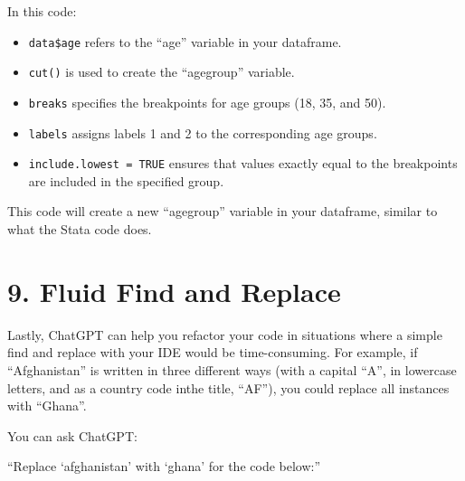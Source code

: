 \documentclass[
  letterpaper,
  DIV=11,
  numbers=noendperiod]{scrreprt}
\newenvironment{Shaded}{\begin{snugshade}}{\end{snugshade}}
\newcommand{\AttributeTok}[1]{\textcolor[rgb]{0.40,0.45,0.13}{#1}}
\newcommand{\ConstantTok}[1]{\textcolor[rgb]{0.56,0.35,0.01}{#1}}
\newcommand{\DecValTok}[1]{\textcolor[rgb]{0.68,0.00,0.00}{#1}}
\newcommand{\DocumentationTok}[1]{\textcolor[rgb]{0.37,0.37,0.37}{\textit{#1}}}
\newcommand{\FunctionTok}[1]{\textcolor[rgb]{0.28,0.35,0.67}{#1}}
\newcommand{\NormalTok}[1]{\textcolor[rgb]{0.00,0.23,0.31}{#1}}
\newcommand{\OtherTok}[1]{\textcolor[rgb]{0.00,0.23,0.31}{#1}}
\newcommand{\SpecialCharTok}[1]{\textcolor[rgb]{0.37,0.37,0.37}{#1}}
\providecommand{\tightlist}{%
  \setlength{\itemsep}{0pt}\setlength{\parskip}{0pt}}\usepackage{longtable,booktabs,array}
\begin{document}
\begin{Shaded}
\end{Shaded}

In this code:

\begin{itemize}
\tightlist
\item
  \texttt{data\$age} refers to the ``age'' variable in your dataframe.
\item
  \texttt{cut()} is used to create the ``agegroup'' variable.
\item
  \texttt{breaks} specifies the breakpoints for age groups (18, 35, and
  50).
\item
  \texttt{labels} assigns labels 1 and 2 to the corresponding age
  groups.
\item
  \texttt{include.lowest\ =\ TRUE} ensures that values exactly equal to
  the breakpoints are included in the specified group.
\end{itemize}

This code will create a new ``agegroup'' variable in your dataframe,
similar to what the Stata code does.

\section{9. Fluid Find and Replace}\label{fluid-find-and-replace}

Lastly, ChatGPT can help you refactor your code in situations where a
simple find and replace with your IDE would be time-consuming. For
example, if ``Afghanistan'' is written in three different ways (with a
capital ``A'', in lowercase letters, and as a country code inthe title,
``AF''), you could replace all instances with ``Ghana''.

You can ask ChatGPT:

``Replace `afghanistan' with `ghana' for the code below:''
\end{document}
